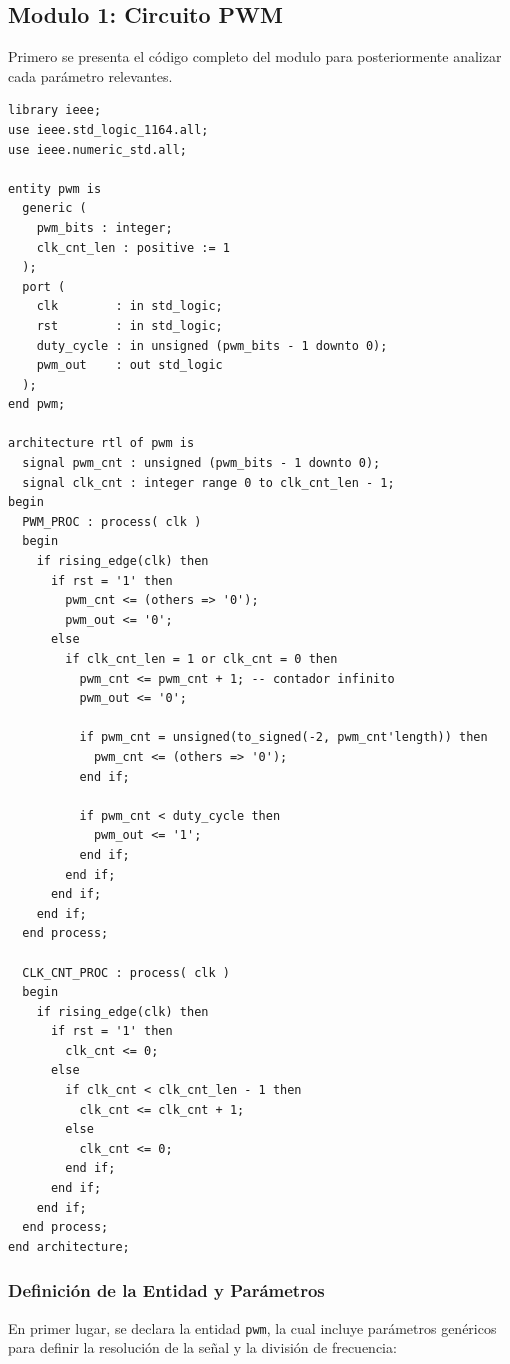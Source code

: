 \documentclass[a4paper,12pt]{article}
\begin{document}
\subsection{Modulo 1: Circuito PWM}

Primero se presenta el código completo del modulo para posteriormente analizar cada parámetro relevantes.

\newpage

\begin{lstlisting}[caption={Código completo del módulo PWM}, label={lst:pwm_full}]
library ieee;
use ieee.std_logic_1164.all;
use ieee.numeric_std.all;

entity pwm is
  generic (
    pwm_bits : integer;
    clk_cnt_len : positive := 1
  );
  port (
    clk        : in std_logic;
    rst        : in std_logic;
    duty_cycle : in unsigned (pwm_bits - 1 downto 0);
    pwm_out    : out std_logic
  );
end pwm;

architecture rtl of pwm is
  signal pwm_cnt : unsigned (pwm_bits - 1 downto 0);
  signal clk_cnt : integer range 0 to clk_cnt_len - 1;
begin
  PWM_PROC : process( clk )
  begin
    if rising_edge(clk) then
      if rst = '1' then
        pwm_cnt <= (others => '0');
        pwm_out <= '0';
      else
        if clk_cnt_len = 1 or clk_cnt = 0 then
          pwm_cnt <= pwm_cnt + 1; -- contador infinito
          pwm_out <= '0';

          if pwm_cnt = unsigned(to_signed(-2, pwm_cnt'length)) then
            pwm_cnt <= (others => '0');
          end if;

          if pwm_cnt < duty_cycle then
            pwm_out <= '1';
          end if;
        end if;
      end if;
    end if;
  end process; 

  CLK_CNT_PROC : process( clk )
  begin
    if rising_edge(clk) then
      if rst = '1' then
        clk_cnt <= 0;
      else
        if clk_cnt < clk_cnt_len - 1 then
          clk_cnt <= clk_cnt + 1;
        else
          clk_cnt <= 0;
        end if;
      end if;
    end if;
  end process; 
end architecture;
\end{lstlisting}


\subsubsection*{Definición de la Entidad y Parámetros}

En primer lugar, se declara la entidad \texttt{pwm}, la cual incluye parámetros genéricos para definir la resolución de la señal y la división de frecuencia:
\end{document}

